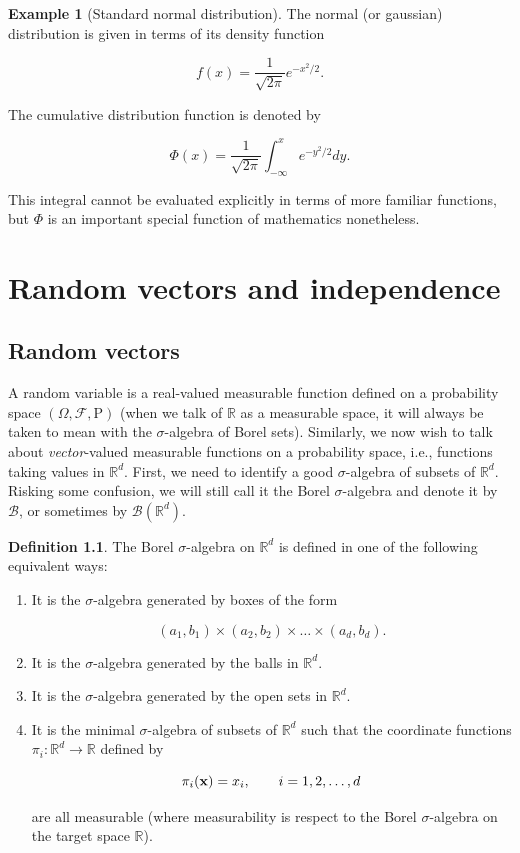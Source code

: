 \documentclass[11pt]{report}
\providecommand{\cal}{\mathcal}
\newcommand{\R}{\mathbb{R}}
\theoremstyle{plain}
\theoremstyle{definition}
\newtheorem{defn}[thm]{Definition}
\newtheorem{example}[thm]{Example}
\begin{document}
\begin{example}[Standard normal distribution]
The normal (or gaussian) distribution is given in
terms of its density function

\[
f(x) = \frac{1}{\sqrt{2\pi}} e^{-x^2/2}.
\]

The cumulative distribution function is denoted by

\[
\Phi(x) = \frac{1}{\sqrt{2\pi}} \int_{-\infty}^x e^{-y^2/2} dy.
\]

This integral cannot be evaluated explicitly in
terms of more familiar functions, but $\Phi$ is an
important special function of mathematics nonetheless.
\end{example}

\chapter{Random vectors and independence}

\section{Random vectors}
A random variable is a real-valued measurable
function defined on a probability space
$(\Omega, {\cal F}, \mathrm{P})$ (when we talk of $\R$
as a measurable space, it will always be taken to mean
with the $\sigma$-algebra of Borel sets). Similarly,
we now wish to talk about \emph{vector}-valued measurable
functions on a probability space, i.e., functions
taking values in $\R^d$. First, we need to identify a
good $\sigma$-algebra of subsets of $\R^d$. Risking
some confusion, we will still call it the Borel
$\sigma$-algebra and denote it by ${\cal B}$, or
sometimes by ${\cal B}(\R^d)$.

\begin{defn}
\label{defi-borelrd}
The Borel $\sigma$-algebra on $\R^d$ is defined in
one of the following equivalent ways:

\begin{enumerate}[label=(\roman*)]
\item It is the $\sigma$-algebra generated by boxes of the
form

\[
(a_1,b_1) \times (a_2,b_2) \times \ldots \times (a_d,b_d).
\]

\item It is the $\sigma$-algebra generated by the balls in
$\R^d$.

\item It is the $\sigma$-algebra generated by the open sets
in $\R^d$.

\item It is the minimal $\sigma$-algebra of subsets of
$\R^d$ such that the coordinate functions
$\pi_i:\R^d\to\R$ defined by

\[
\pi_i({\bf x}) = x_i, \qquad i=1,2,\ldots,d
\]

are all measurable (where measurability is respect
to the Borel $\sigma$-algebra on the target space
$\R$).
\end{enumerate}

\end{defn}
\end{document}
